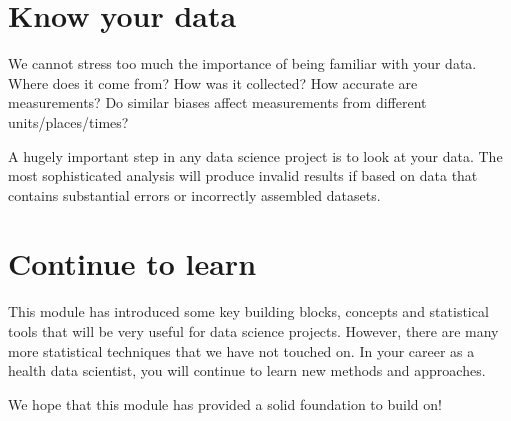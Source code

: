 \documentclass[letterpaper,10pt,english]{jupyterBook}
\begin{document}
\section{Know your data}
\label{\detokenize{18. Statistics for HDS round up:know-your-data}}
\sphinxAtStartPar
We cannot stress too much the importance of being familiar with your data. Where does it come from? How was it collected? How accurate are measurements? Do similar biases affect measurements from different units/places/times?

\sphinxAtStartPar
A hugely important step in any data science project is to look at your data. The most sophisticated analysis will produce invalid results if based on data that contains substantial errors or incorrectly assembled datasets.


\section{Continue to learn}
\label{\detokenize{18. Statistics for HDS round up:continue-to-learn}}
\sphinxAtStartPar
This module has introduced some key building blocks, concepts and statistical tools that will be very useful for data science projects. However, there are many more statistical techniques that we have not touched on. In your career as a health data scientist, you will continue to learn new methods and approaches.

\sphinxAtStartPar
We hope that this module has provided a solid foundation to build on!







\renewcommand{\indexname}{Index}
\printindex
\end{document}
